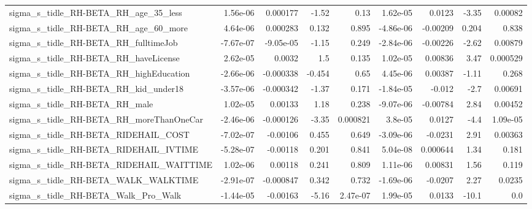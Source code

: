 \begin{tabular}{lrrrrrrrr}
sigma\_s\_tidle\_RH-BETA\_RH\_age\_35\_less               &    1.56e-06 &     0.000177 &     -1.52 &     0.13 &   1.62e-05 &      0.0123 &        -3.35 &       0.00082 \\
sigma\_s\_tidle\_RH-BETA\_RH\_age\_60\_more               &    4.64e-06 &     0.000283 &     0.132 &    0.895 &  -4.86e-06 &    -0.00209 &        0.204 &         0.838 \\
sigma\_s\_tidle\_RH-BETA\_RH\_fulltimeJob               &   -7.67e-07 &    -9.05e-05 &     -1.15 &    0.249 &  -2.84e-06 &    -0.00226 &        -2.62 &       0.00879 \\
sigma\_s\_tidle\_RH-BETA\_RH\_haveLicense               &    2.62e-05 &       0.0032 &       1.5 &    0.135 &   1.02e-05 &     0.00836 &         3.47 &      0.000529 \\
sigma\_s\_tidle\_RH-BETA\_RH\_highEducation             &   -2.66e-06 &    -0.000338 &    -0.454 &     0.65 &   4.45e-06 &     0.00387 &        -1.11 &         0.268 \\
sigma\_s\_tidle\_RH-BETA\_RH\_kid\_under18               &   -3.57e-06 &    -0.000342 &     -1.37 &    0.171 &  -1.84e-05 &      -0.012 &         -2.7 &       0.00691 \\
sigma\_s\_tidle\_RH-BETA\_RH\_male                      &    1.02e-05 &      0.00133 &      1.18 &    0.238 &  -9.07e-06 &    -0.00784 &         2.84 &       0.00452 \\
sigma\_s\_tidle\_RH-BETA\_RH\_moreThanOneCar            &   -2.46e-06 &    -0.000126 &     -3.35 & 0.000821 &    3.8e-05 &      0.0127 &         -4.4 &      1.09e-05 \\
sigma\_s\_tidle\_RH-BETA\_RIDEHAIL\_COST                &   -7.02e-07 &     -0.00106 &     0.455 &    0.649 &  -3.09e-06 &     -0.0231 &         2.91 &       0.00363 \\
sigma\_s\_tidle\_RH-BETA\_RIDEHAIL\_IVTIME              &   -5.28e-07 &     -0.00118 &     0.201 &    0.841 &   5.04e-08 &    0.000644 &         1.34 &         0.181 \\
sigma\_s\_tidle\_RH-BETA\_RIDEHAIL\_WAITTIME            &    1.02e-06 &      0.00118 &     0.241 &    0.809 &   1.11e-06 &     0.00831 &         1.56 &         0.119 \\
sigma\_s\_tidle\_RH-BETA\_WALK\_WALKTIME                &   -2.91e-07 &    -0.000847 &     0.342 &    0.732 &  -1.69e-06 &     -0.0207 &         2.27 &        0.0235 \\
sigma\_s\_tidle\_RH-BETA\_Walk\_Pro\_Walk                &   -1.44e-05 &     -0.00163 &     -5.16 & 2.47e-07 &   1.99e-05 &      0.0133 &        -10.1 &           0.0 \\

\end{tabular}
